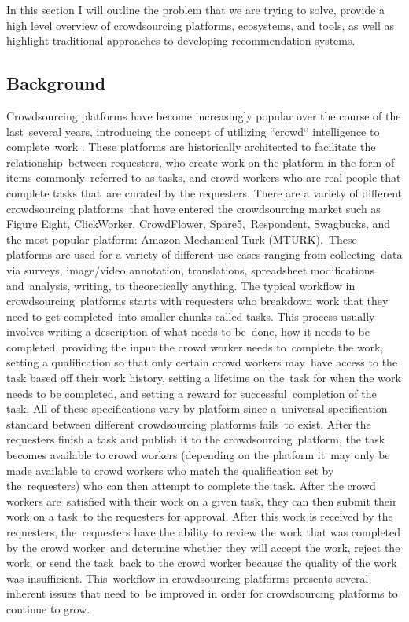 \documentclass[letterpaper,12pt]{article}
\begin{document}
In this section I will outline the problem that we are trying to solve, provide a high level overview of crowdsourcing platforms, ecosystems, and tools, as well as highlight traditional approaches to developing recommendation systems.
\subsection{Background}
Crowdsourcing platforms have become increasingly popular over the course of the last\ 
several years, introducing the concept of utilizing ``crowd`` intelligence to complete\
work \cite{kuek2015global}. These platforms are historically architected to facilitate the relationship\ 
between requesters, who create work on the platform in the form of items commonly\ 
referred to as tasks, and crowd workers who are real people that complete tasks that\ 
are curated by the requesters. There are a variety of different crowdsourcing platforms\ 
that have entered the crowdsourcing market such as Figure Eight, ClickWorker, CrowdFlower, Spare5,\ 
Respondent, Swagbucks, and the most popular platform: Amazon Mechanical Turk (MTURK).\ 
These platforms are used for a variety of different use cases ranging from collecting\
data via surveys, image/video annotation, translations, spreadsheet modifications and\ 
analysis, writing, to theoretically anything. The typical workflow in crowdsourcing\ 
platforms starts with requesters who breakdown work that they need to get completed\ 
into smaller chunks called tasks. This process usually involves writing a description of what needs to be\ 
done, how it needs to be completed, providing the input the crowd worker needs to\ 
complete the work, setting a qualification so that only certain crowd workers may\ 
have access to the task based off their work history, setting a lifetime on the\ 
task for when the work needs to be completed, and setting a reward for successful\ 
completion of the task. All of these specifications vary by platform since a\ 
universal specification standard between different crowdsourcing platforms fails\ 
to exist. \cite{allahbakhsh2013quality} After the requesters finish a task and publish it to the crowdsourcing\ 
platform, the task becomes available to crowd workers (depending on the platform it\ 
may only be made available to crowd workers who match the qualification set by the\ 
requesters) who can then attempt to complete the task. After the crowd workers are\ 
satisfied with their work on a given task, they can then submit their work on a task\ 
to the requesters for approval. After this work is received by the requesters, the\ 
requesters have the ability to review the work that was completed by the crowd worker\
and determine whether they will accept the work, reject the work, or send the task\ 
back to the crowd worker because the quality of the work was insufficient. This\ 
workflow in crowdsourcing platforms presents several inherent issues that need to\ 
be improved in order for crowdsourcing platforms to continue to grow.
\end{document}
